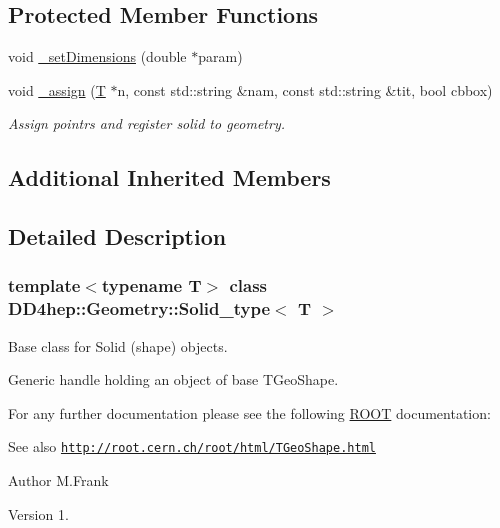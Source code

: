 \subsection*{Protected Member Functions}
\begin{DoxyCompactItemize}
\item 
void \hyperlink{class_d_d4hep_1_1_geometry_1_1_solid__type_a1a3a86774632f79e32518a7c77ad1fe8}{\+\_\+set\+Dimensions} (double $\ast$param)
\item 
void \hyperlink{class_d_d4hep_1_1_geometry_1_1_solid__type_ac59f345548d169f3f773448ae6d67680}{\+\_\+assign} (\hyperlink{class_t}{T} $\ast$n, const std\+::string \&nam, const std\+::string \&tit, bool cbbox)
\begin{DoxyCompactList}\small\item\em Assign pointrs and register solid to geometry. \end{DoxyCompactList}\end{DoxyCompactItemize}
\subsection*{Additional Inherited Members}


\subsection{Detailed Description}
\subsubsection*{template$<$typename T$>$\newline
class D\+D4hep\+::\+Geometry\+::\+Solid\+\_\+type$<$ T $>$}

Base class for Solid (shape) objects. 

Generic handle holding an object of base T\+Geo\+Shape.

For any further documentation please see the following \hyperlink{namespace_r_o_o_t}{R\+O\+OT} documentation\+: \begin{DoxySeeAlso}{See also}
\href{http://root.cern.ch/root/html/TGeoShape.html}{\tt http\+://root.\+cern.\+ch/root/html/\+T\+Geo\+Shape.\+html}
\end{DoxySeeAlso}
\begin{DoxyAuthor}{Author}
M.\+Frank 
\end{DoxyAuthor}
\begin{DoxyVersion}{Version}
1. 
\end{DoxyVersion}


